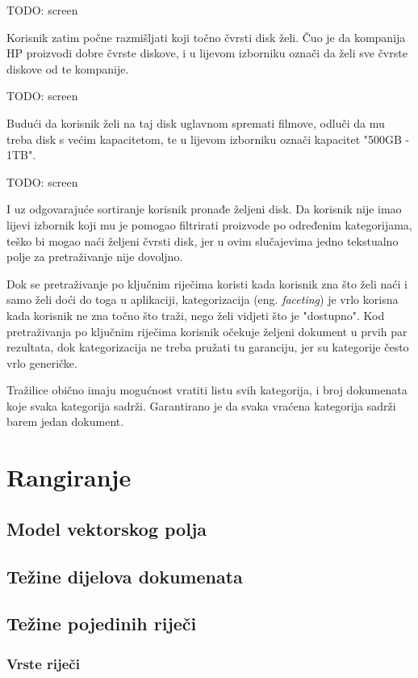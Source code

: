\documentclass[11pt]{scrreprt}
\begin{document}
TODO: screen

Korisnik zatim počne razmišljati koji točno čvrsti disk želi. Čuo je da kompanija HP proizvodi dobre čvrste diskove, i u lijevom izborniku označi da želi sve čvrste diskove od te kompanije.

TODO: screen

Budući da korisnik želi na taj disk uglavnom spremati filmove, odluči da mu treba disk s većim kapacitetom, te u lijevom izborniku označi kapacitet "500GB - 1TB".

TODO: screen

I uz odgovarajuće sortiranje korisnik pronađe željeni disk. Da korisnik nije imao lijevi izbornik koji mu je pomogao filtrirati proizvode po određenim kategorijama, teško bi mogao naći željeni čvrsti disk, jer u ovim slučajevima jedno tekstualno polje za pretraživanje nije dovoljno.

Dok se pretraživanje po ključnim riječima koristi kada korisnik zna što želi naći i samo želi doći do toga u aplikaciji, kategorizacija (eng. \textit{faceting}) je vrlo korisna kada korisnik ne zna točno što traži, nego želi vidjeti što je "dostupno". Kod pretraživanja po ključnim riječima korisnik očekuje željeni dokument u prvih par rezultata, dok kategorizacija ne treba pružati tu garanciju, jer su kategorije često vrlo generičke.

Tražilice obično imaju mogućnost vratiti listu svih kategorija, i broj dokumenata koje svaka kategorija sadrži. Garantirano je da svaka vraćena kategorija sadrži barem jedan dokument.

\chapter{Rangiranje}

\section{Model vektorskog polja}

\section{Težine dijelova dokumenata}

\section{Težine pojedinih riječi}

\subsection{Vrste riječi}
\end{document}

